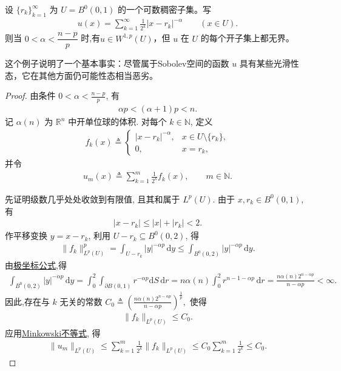 \documentclass[../../main.tex]{subfiles}
\begin{document}
\begin{example}\label{example:ch05-稠密点奇异}
设 $\{r_{k}\}_{k=1}^{\infty}$ 为 $U=B^{0}(0,1)$ 的一个可数稠密子集。写
\begin{align*}
u(x)=\sum_{k=1}^{\infty}\frac{1}{2^{k}}|x-r_{k}|^{-\alpha}\qquad (x\in U).
\end{align*}
则当 $0<\alpha<\dfrac{n-p}{p}$ 时,有$u\in W^{1,p}(U)$，但 $u$ 在 $U$ 的每个开子集上都无界。
\end{example}
\begin{remark}
这个例子说明了一个基本事实：尽管属于Sobolev空间的函数 $u$ 具有某些光滑性态，它在其他方面仍可能性态相当恶劣。
\end{remark}
\begin{proof}
由条件 $0<\alpha<\frac{n-p}{p}$, 有
\begin{align*}
\alpha p<(\alpha+1)p<n.
\end{align*}
记 $\alpha(n)$ 为 $\mathbb{R}^n$ 中开单位球的体积. 对每个 $k\in\mathbb{N}$, 定义
\begin{align*}
f_k(x)\triangleq
\begin{cases}
|x-r_k|^{-\alpha}, & x\in U\setminus\{r_k\},\\
0, & x=r_k,
\end{cases}
\end{align*}
并令
\begin{align*}
u_m(x)\triangleq\sum\limits_{k=1}^{m}\frac{1}{2^k}f_k(x),
\qquad m\in\mathbb{N}.
\end{align*}

先证明级数几乎处处收敛到有限值, 且其和属于 $L^p(U)$.
由于 $x,r_k\in B^{0}(0,1)$, 有
\begin{align*}
|x-r_k|\leqslant|x|+|r_k|<2.
\end{align*}
作平移变换 $y=x-r_k$, 利用 $U-r_k\subseteq B^{0}(0,2)$, 得
\begin{align*}
\|f_k\|_{L^p(U)}^p
=\int_{U-r_k}|y|^{-\alpha p}\,\mathrm{d}y\leqslant\int_{B^{0}(0,2)}|y|^{-\alpha p}\,\mathrm{d}y.
\end{align*}
由\hyperref[theorem:appC-极坐标]{极坐标公式},得
\begin{align}\label{eq::JIFJIJOIWjjjjiij}
\int_{B^0(0,2)}{|y|^{-\alpha p}\,\mathrm{d}y}=\int_0^2{\int_{\partial B(0,1)}{r^{-\alpha p}\mathrm{d}S\,\mathrm{d}r}}=n\alpha (n)\int_0^2{r^{n-1-\alpha p}\,\mathrm{d}r}=\frac{n\alpha (n)2^{n-\alpha p}}{n-\alpha p}<\infty .
\end{align}
因此,存在与 $k$ 无关的常数
$C_0\triangleq
\left(\frac{n\alpha(n)2^{n-\alpha p}}{n-\alpha p}\right)^{\frac{1}{p}},$
使得
\begin{align*}
\|f_k\|_{L^p(U)}\leqslant C_0.
\end{align*}
应用\hyperref[Real Analysis-theorem:实变函数--Minkowski不等式]{Minkowski不等式}, 得
\begin{align*}
\|u_m\|_{L^p(U)}
\leqslant
\sum\limits_{k=1}^{m}\frac{1}{2^k}\|f_k\|_{L^p(U)}
\leqslant C_0\sum\limits_{k=1}^{m}\frac{1}{2^k}
\leqslant C_0.
\end{align*}


\end{proof}
\end{document}
